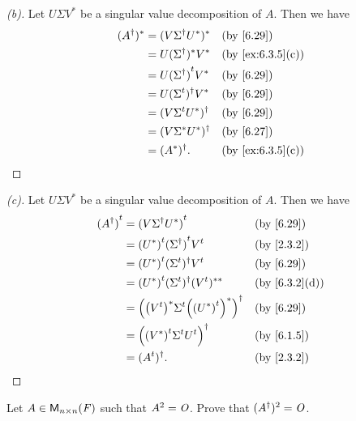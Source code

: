 \begin{proof}[(b)]
  Let \(U \Sigma V^*\) be a singular value decomposition of \(A\).
  Then we have
  \begin{align*}
    (A^{\dag})^* & = (V \Sigma^{\dag} U^*)^*    &  & \by{6.29}        \\
                 & = U (\Sigma^{\dag})^* V^*    &  & \by{ex:6.3.5}[c] \\
                 & = U \tp{(\Sigma^{\dag})} V^* &  & \by{6.29}        \\
                 & = U (\tp{\Sigma})^{\dag} V^* &  & \by{6.29}        \\
                 & = (V \tp{\Sigma} U^*)^{\dag} &  & \by{6.29}        \\
                 & = (V \Sigma^* U^*)^{\dag}    &  & \by{6.27}        \\
                 & = (A^*)^{\dag}.              &  & \by{ex:6.3.5}[c]
  \end{align*}
\end{proof}

\begin{proof}[(c)]
  Let \(U \Sigma V^*\) be a singular value decomposition of \(A\).
  Then we have
  \begin{align*}
    \tp{(A^{\dag})} & = \tp{(V \Sigma^{\dag} U^*)}                              &  & \by{6.29}     \\
                    & = \tp{(U^*)} \tp{(\Sigma^{\dag})} \tp{V}                  &  & \by{2.3.2}    \\
                    & = \tp{(U^*)} (\tp{\Sigma})^{\dag} \tp{V}                  &  & \by{6.29}     \\
                    & = \tp{(U^*)} (\tp{\Sigma})^{\dag} (\tp{V})^{**}           &  & \by{6.3.2}[d] \\
                    & = \pa{\pa{\tp{V}}^* \tp{\Sigma} \pa{\tp{(U^*)}}^*}^{\dag} &  & \by{6.29}     \\
                    & = \pa{\tp{\pa{V^*}} \tp{\Sigma} \tp{U}}^{\dag}            &  & \by{6.1.5}    \\
                    & = (\tp{A})^{\dag}.                                        &  & \by{2.3.2}
  \end{align*}
\end{proof}

\begin{ex}\label{ex:6.7.20}
  Let \(A \in \ms[n][n][\F]\) such that \(A^2 = \mathit{O}\).
  Prove that \((A^{\dag})^2 = \mathit{O}\).
\end{ex}

